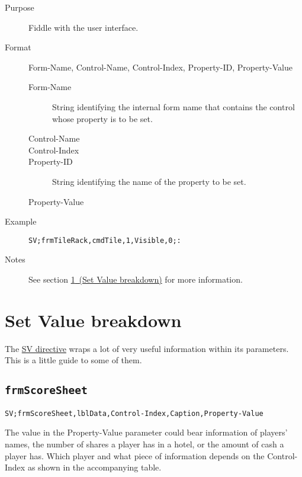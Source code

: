 \documentclass{article}
\providecommand{\wiredata}[1]{\texttt{{#1}}}
\begin{document}
\begin{description}
  \item[Purpose] Fiddle with the user interface.
  \item[Format] Form-Name, Control-Name, Control-Index, Property-ID, Property-Value
  \begin{description}
    \item[Form-Name] String identifying the internal form name that contains the control whose property is to be set.
    \item[Control-Name]
    \item[Control-Index]
    \item[Property-ID] String identifying the name of the property to be set.
    \item[Property-Value]
  \end{description}
  \item[Example] \wiredata{SV;frmTileRack,cmdTile,1,Visible,0;:}
  \item[Notes] See section \hyperref[sec:set_value_breakdown]{\ref{sec:set_value_breakdown}~(Set Value breakdown)} for more information.
\end{description}




\section{Set Value breakdown} %
\label{sec:set_value_breakdown}

The \hyperref[ssub:sv_set_value]{SV directive} wraps a lot of very useful information within its parameters. This is a little guide to some of them.

\subsection{\texttt{frmScoreSheet}} %
\label{sub:frmscoresheet}

\texttt{SV;frmScoreSheet,lblData,\textrm{Control-Index},Caption,\textrm{Property-Value}}

The value in the Property-Value parameter could bear information of players' names, the number of shares a player has in a hotel, or the amount of cash a player has. Which player and what piece of information depends on the Control-Index as shown in the accompanying table.
\end{document}
